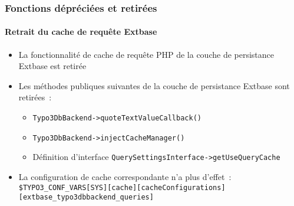 \begin{frame}[fragile]
	\frametitle{Fonctions dépréciées et retirées}
	\framesubtitle{Retrait du cache de requête Extbase}

	\begin{itemize}

		\item La fonctionnalité de cache de requête PHP de la couche de persistance Extbase est retirée

		\item Les méthodes publiques suivantes de la couche de persistance Extbase sont retirées~:

			\begin{itemize}
				\item \small\texttt{Typo3DbBackend->quoteTextValueCallback()}\normalsize
				\item \small\texttt{Typo3DbBackend->injectCacheManager()}\normalsize
				\item Définition d'interface \small\texttt{QuerySettingsInterface->getUseQueryCache}\normalsize
			\end{itemize}

		\item La configuration de cache correspondante n'a plus d'effet~:\newline
			\smaller
				\texttt{\$TYPO3\_CONF\_VARS[SYS][cache][cacheConfigurations]}\newline
				\tabto{0.4cm}\texttt{[extbase\_typo3dbbackend\_queries]}
			\normalsize

	\end{itemize}

\end{frame}


